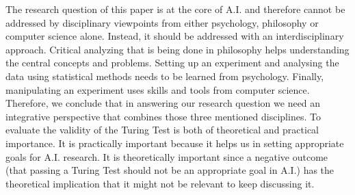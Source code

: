      The research question of this paper is at the core of A.I. and therefore cannot be addressed by disciplinary viewpoints from either psychology, philosophy or computer science alone. Instead, it should be addressed with an interdisciplinary approach. Critical analyzing that is being done in philosophy helps understanding the central concepts and problems. Setting up an experiment and analysing the data using statistical methods needs to be learned from psychology. Finally, manipulating an experiment uses skills and tools from computer science. Therefore, we conclude that in answering our research question we need an integrative perspective that combines those three mentioned disciplines. To evaluate the validity of the Turing Test is both of theoretical and practical importance. It is practically important because it helps us in setting appropriate goals for A.I. research. It is theoretically important since a negative outcome (that passing a Turing Test should not be an appropriate goal in A.I.) has the theoretical implication that it might not be relevant to keep discussing it.
